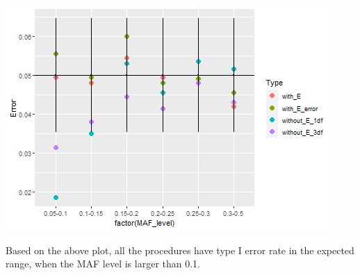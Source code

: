 \documentclass[
]{article}
\newenvironment{Shaded}{\begin{snugshade}}{\end{snugshade}}
\newcommand{\DataTypeTok}[1]{\textcolor[rgb]{0.13,0.29,0.53}{#1}}
\newcommand{\DecValTok}[1]{\textcolor[rgb]{0.00,0.00,0.81}{#1}}
\newcommand{\FloatTok}[1]{\textcolor[rgb]{0.00,0.00,0.81}{#1}}
\newcommand{\KeywordTok}[1]{\textcolor[rgb]{0.13,0.29,0.53}{\textbf{#1}}}
\newcommand{\NormalTok}[1]{#1}
\newcommand{\OperatorTok}[1]{\textcolor[rgb]{0.81,0.36,0.00}{\textbf{#1}}}
\newcommand{\StringTok}[1]{\textcolor[rgb]{0.31,0.60,0.02}{#1}}
\begin{document}
\begin{Shaded}
\end{Shaded}

\includegraphics{stats-gene-research-progress-v9_files/figure-latex/unnamed-chunk-11-2.png}

Based on the above plot, all the procedures have type I error rate in
the expected range, when the MAF level is larger than 0.1.
\end{document}
